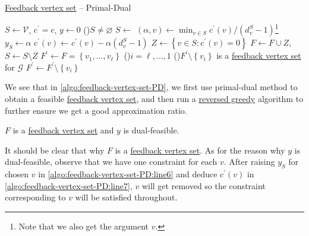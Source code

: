 \begin{algorithm}[H]\label{algo:feedback-vertex-set-PD}
	\DontPrintSemicolon{}
	\caption{\hyperref[prb:feedback-vertex-set]{Feedback vertex set} -- Primal-Dual}
	\BlankLine

	\(S\gets \mathcal{V} \), \(c^\prime = c\), \(y\gets 0\)
	\;
	\While(){\(S \neq \varnothing \)}{
		\(S\gets\) 
		\((\alpha, v) \gets \min _{v\in S} c^\prime (v) / (d_v^S - 1)\)\footnote{Note that we also get the argument \(v\).}
		\(y_S\gets \alpha\)\label{algo:feedback-vertex-set-PD:line6}\;
		\(c^\prime (v)\gets c^\prime (v) - \alpha (d_v^S - 1)\)\label{algo:feedback-vertex-set-PD:line7}\;
		\(Z\gets \left\{ v\in S\colon c^\prime (v) = 0 \right\} \)\;
		\(F\gets F\cup Z\), \(S\gets S \setminus Z\)\;
	}
	\;
	\(F^\prime \gets F = \left\{ v_1, \dots , v_{\ell} \right\} \)
	\For(\label{algo:feedback-vertex-set-PD:for}){\(i = \ell , \dots  , 1\)}{
		\If(){\(F^\prime \setminus \left\{ v_i \right\}\) is a \hyperref[prb:feedback-vertex-set]{feedback vertex set} for \(\mathcal{G} \)}{
			\(F^\prime \gets F^\prime \setminus \left\{ v_i \right\} \)\;
		}
	}
	\;
\end{algorithm}

We see that in \autoref{algo:feedback-vertex-set-PD}, we first use primal-dual method to obtain a feasible \hyperref[prb:feedback-vertex-set]{feedback vertex set}, and then run a \hyperref[rmk:reversed-greedy]{reversed greedy} algorithm to further ensure we get a good approximation ratio.

\begin{claim}
	\(F\) is a \hyperref[prb:feedback-vertex-set]{feedback vertex set} and \(y\) is dual-feasible.
\end{claim}
\begin{explanation}
	It should be clear that why \(F\) is a \hyperref[prb:feedback-vertex-set]{feedback vertex set}. As for the reason why \(y\) is dual-feasible, observe that we have one constraint for each \(v\). After raising \(y_S\) for chosen \(v\) in \autoref{algo:feedback-vertex-set-PD:line6} and deduce \(c^\prime (v)\) in \autoref{algo:feedback-vertex-set-PD:line7}, \(v\) will get removed so the constraint corresponding to \(v\) will be satisfied throughout.
\end{explanation}

